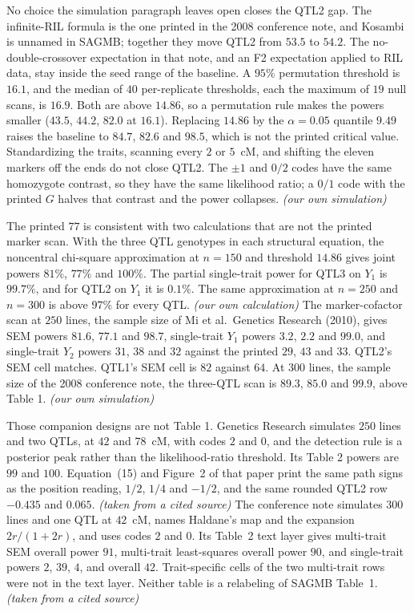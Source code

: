 \documentclass[11pt]{article}
\newcommand{\ev}[1]{\textup{\emph{(#1)}}}
\begin{document}
No choice the simulation paragraph leaves open closes the QTL2 gap. The
infinite-RIL formula is the one printed in the 2008 conference note, and
Kosambi is unnamed in SAGMB; together they move QTL2 from $53.5$ to $54.2$.
The no-double-crossover expectation in that note, and an F2 expectation
applied to RIL data, stay inside the seed range of the baseline. A
$95\%$ permutation threshold is $16.1$, and the median of $40$ per-replicate
thresholds, each the maximum of $19$ null scans, is $16.9$. Both are above
$14.86$, so a permutation rule makes the powers smaller ($43.5$, $44.2$,
$82.0$ at $16.1$). Replacing $14.86$ by the $\alpha=0.05$ quantile $9.49$
raises the baseline to $84.7$, $82.6$ and $98.5$, which is not the printed
critical value. Standardizing the traits, scanning every $2$ or $5$~cM, and
shifting the eleven markers off the ends do not close QTL2. The $\pm 1$ and
$0/2$ codes have the same homozygote contrast, so they have the same
likelihood ratio; a $0/1$ code with the printed $G$ halves that contrast and
the power collapses. \ev{our own simulation}

The printed $77$ is consistent with two calculations that are not the
printed marker scan. With the three QTL genotypes in each structural
equation, the noncentral chi-square approximation at $n=150$ and threshold
$14.86$ gives joint powers $81\%$, $77\%$ and $100\%$. The partial
single-trait power for QTL3 on $Y_1$ is $99.7\%$, and for QTL2 on $Y_1$ it
is $0.1\%$. The same approximation at $n=250$ and $n=300$ is above $97\%$
for every QTL. \ev{our own calculation}
The marker-cofactor scan at $250$ lines, the sample size of Mi et al.\
Genetics Research (2010), gives SEM powers $81.6$, $77.1$ and $98.7$,
single-trait $Y_1$ powers $3.2$, $2.2$ and $99.0$, and single-trait $Y_2$
powers $31$, $38$ and $32$ against the printed $29$, $43$ and $33$. QTL2's
SEM cell matches. QTL1's SEM cell is $82$ against $64$. At $300$ lines, the
sample size of the 2008 conference note, the three-QTL scan is $89.3$,
$85.0$ and $99.9$, above Table 1. \ev{our own simulation}

Those companion designs are not Table 1. Genetics Research simulates $250$
lines and two QTLs, at $42$ and $78$~cM, with codes $2$ and $0$, and the
detection rule is a posterior peak rather than the likelihood-ratio
threshold. Its Table 2 powers are $99$ and $100$. Equation~(15) and Figure~2
of that paper print the same path signs as the position reading, $1/2$, $1/4$
and $-1/2$, and the same rounded QTL2 row $-0.435$ and $0.065$.
\ev{taken from a cited source}
The conference note simulates $300$ lines and one QTL at $42$~cM, names
Haldane's map and the expansion $2r/(1+2r)$, and uses codes $2$ and $0$.
Its Table~2 text layer gives multi-trait SEM overall power $91$, multi-trait
least-squares overall power $90$, and single-trait powers $2$, $39$, $4$,
and overall $42$. Trait-specific cells of the two multi-trait rows were not
in the text layer. Neither table is a relabeling of SAGMB Table~1.
\ev{taken from a cited source}
\end{document}
